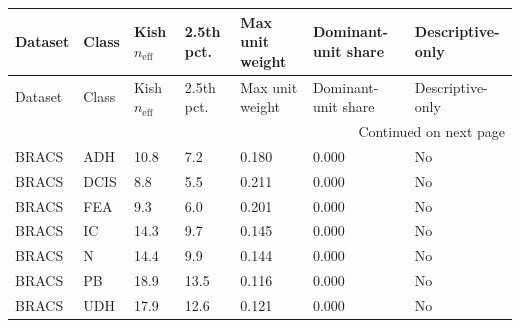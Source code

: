 \begin{longtable}{lllllll}
\toprule
Dataset & Class & Kish $n_{\mathrm{eff}}$ & 2.5th pct. & Max unit weight & Dominant-unit share & Descriptive-only \\
\midrule
\endfirsthead
\toprule
Dataset & Class & Kish $n_{\mathrm{eff}}$ & 2.5th pct. & Max unit weight & Dominant-unit share & Descriptive-only \\
\midrule
\endhead
\midrule
\multicolumn{7}{r}{Continued on next page} \\
\midrule
\endfoot
\bottomrule
\endlastfoot
BRACS & ADH & 10.8 & 7.2 & 0.180 & 0.000 & No \\
BRACS & DCIS & 8.8 & 5.5 & 0.211 & 0.000 & No \\
BRACS & FEA & 9.3 & 6.0 & 0.201 & 0.000 & No \\
BRACS & IC & 14.3 & 9.7 & 0.145 & 0.000 & No \\
BRACS & N & 14.4 & 9.9 & 0.144 & 0.000 & No \\
BRACS & PB & 18.9 & 13.5 & 0.116 & 0.000 & No \\
BRACS & UDH & 17.9 & 12.6 & 0.121 & 0.000 & No \\
\end{longtable}
